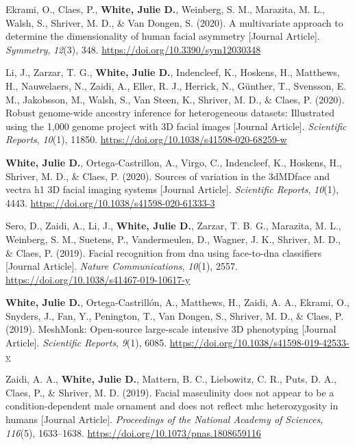 \documentclass[11pt, a4paper]{awesome-cv}
\begin{document}
\leavevmode\hypertarget{ref-Ekrami_2020_MultivariateAsymmetry}{}%
Ekrami, O., Claes, P., \textbf{White, Julie D.}, Weinberg, S. M.,
Marazita, M. L., Walsh, S., Shriver, M. D., \& Van Dongen, S. (2020). A
multivariate approach to determine the dimensionality of human facial
asymmetry {[}Journal Article{]}. \emph{Symmetry}, \emph{12}(3), 348.
\url{https://doi.org/10.3390/sym12030348}

\leavevmode\hypertarget{ref-Li_2020_AncestryInference}{}%
Li, J., Zarzar, T. G., \textbf{White, Julie D.}, Indencleef, K.,
Hoskens, H., Matthews, H., Nauwelaers, N., Zaidi, A., Eller, R. J.,
Herrick, N., Günther, T., Svensson, E. M., Jakobsson, M., Walsh, S., Van
Steen, K., Shriver, M. D., \& Claes, P. (2020). Robust genome-wide
ancestry inference for heterogeneous datasets: Illustrated using the
1,000 genome project with 3D facial images {[}Journal Article{]}.
\emph{Scientific Reports}, \emph{10}(1), 11850.
\url{https://doi.org/10.1038/s41598-020-68259-w}

\leavevmode\hypertarget{ref-White_2020_CameraVariation}{}%
\textbf{White, Julie D.}, Ortega-Castrillon, A., Virgo, C., Indencleef,
K., Hoskens, H., Shriver, M. D., \& Claes, P. (2020). Sources of
variation in the 3dMDface and vectra h1 3D facial imaging systems
{[}Journal Article{]}. \emph{Scientific Reports}, \emph{10}(1), 4443.
\url{https://doi.org/10.1038/s41598-020-61333-3}

\leavevmode\hypertarget{ref-Sero_2019_FaceToDNA}{}%
Sero, D., Zaidi, A., Li, J., \textbf{White, Julie D.}, Zarzar, T. B. G.,
Marazita, M. L., Weinberg, S. M., Suetens, P., Vandermeulen, D., Wagner,
J. K., Shriver, M. D., \& Claes, P. (2019). Facial recognition from dna
using face-to-dna classifiers {[}Journal Article{]}. \emph{Nature
Communications}, \emph{10}(1), 2557.
\url{https://doi.org/10.1038/s41467-019-10617-y}

\leavevmode\hypertarget{ref-White_2019_MeshMonk}{}%
\textbf{White, Julie D.}, Ortega-Castrillón, A., Matthews, H., Zaidi, A.
A., Ekrami, O., Snyders, J., Fan, Y., Penington, T., Van Dongen, S.,
Shriver, M. D., \& Claes, P. (2019). MeshMonk: Open-source large-scale
intensive 3D phenotyping {[}Journal Article{]}. \emph{Scientific
Reports}, \emph{9}(1), 6085.
\url{https://doi.org/10.1038/s41598-019-42533-y}

\leavevmode\hypertarget{ref-Zaidi_White_2019_Masculinity}{}%
Zaidi, A. A., \textbf{White, Julie D.}, Mattern, B. C., Liebowitz, C.
R., Puts, D. A., Claes, P., \& Shriver, M. D. (2019). Facial masculinity
does not appear to be a condition-dependent male ornament and does not
reflect mhc heterozygosity in humans {[}Journal Article{]}.
\emph{Proceedings of the National Academy of Sciences}, \emph{116}(5),
1633--1638. \url{https://doi.org/10.1073/pnas.1808659116}
\end{document}
